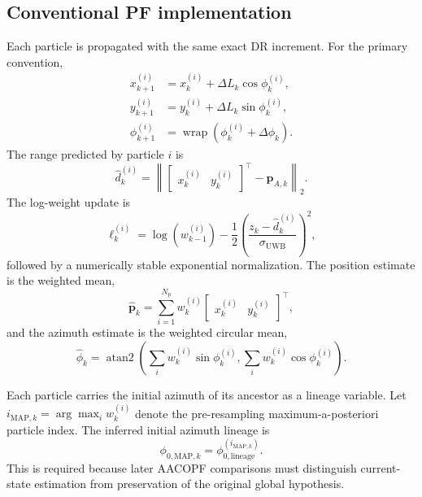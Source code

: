 \subsection{Conventional PF implementation}
Each particle is propagated with the same exact DR increment. For the primary convention,
\begin{align}
    x_{k+1}^{(i)} &= x_k^{(i)}+\Delta L_k\cos\phi_k^{(i)},\\
    y_{k+1}^{(i)} &= y_k^{(i)}+\Delta L_k\sin\phi_k^{(i)},\\
    \phi_{k+1}^{(i)} &= \operatorname{wrap}(\phi_k^{(i)}+\Delta\phi_k).
\end{align}
The range predicted by particle $i$ is
\begin{equation}
    \hat d_k^{(i)}
    =\left\lVert
        \begin{bmatrix}x_k^{(i)}&y_k^{(i)}\end{bmatrix}^{\top}
        -\bm p_{A,k}
    \right\rVert_2.
\end{equation}
The log-weight update is
\begin{equation}
    \ell_k^{(i)}
    =\log\!\left(w_{k-1}^{(i)}\right)
    -\frac{1}{2}
    \left(
        \frac{z_k-\hat d_k^{(i)}}{\sigma_{\mathrm{UWB}}}
    \right)^2,
\end{equation}
followed by a numerically stable exponential normalization. The position estimate is the weighted mean,
\begin{equation}
    \hat{\bm p}_k
    =\sum_{i=1}^{N_p}w_k^{(i)}
    \begin{bmatrix}x_k^{(i)}&y_k^{(i)}\end{bmatrix}^{\top},
\end{equation}
and the azimuth estimate is the weighted circular mean,
\begin{equation}
    \hat\phi_k
    =\operatorname{atan2}
    \left(
        \sum_iw_k^{(i)}\sin\phi_k^{(i)},
        \sum_iw_k^{(i)}\cos\phi_k^{(i)}
    \right).
\end{equation}

Each particle carries the initial azimuth of its ancestor as a lineage variable. Let $i_{\mathrm{MAP},k}=\arg\max_iw_k^{(i)}$ denote the pre-resampling maximum-a-posteriori particle index. The inferred initial azimuth lineage is
\begin{equation}
    \phi_{0,\mathrm{MAP},k}
    =\phi_{0,\mathrm{lineage}}^{(i_{\mathrm{MAP},k})}.
\end{equation}
This is required because later AACOPF comparisons must distinguish current-state estimation from preservation of the original global hypothesis.

